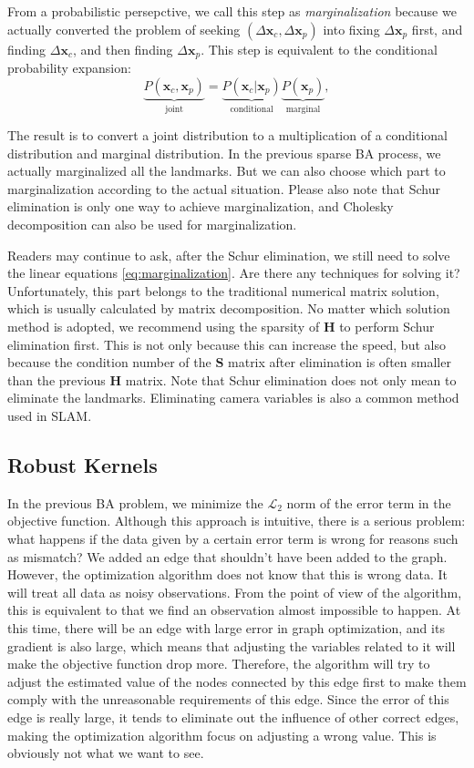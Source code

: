From a probabilistic persepctive, we call this step as \textit{marginalization} because we actually converted the problem of seeking $(\Delta \mathbf{x}_c, \Delta \mathbf{x}_p)$ into fixing  $\Delta \mathbf{x}_p$ first, and finding $\Delta \mathbf{x}_c$, and then finding $\Delta \mathbf{x}_p$. This step is equivalent to the conditional probability expansion:
\begin{equation}
	\underbrace{P( \mathbf{x}_c, \mathbf{x}_p )}_{\text{joint}} = \underbrace{P(\mathbf{x}_c | \mathbf{x}_p )}_{\text{conditional}} \underbrace{P( \mathbf{x}_p )}_{\text{marginal}} ,
\end{equation}

The result is to convert a joint distribution to a multiplication of a conditional distribution and marginal distribution. In the previous sparse BA process, we actually marginalized all the landmarks. But we can also choose which part to marginalization according to the actual situation. Please also note that Schur elimination is only one way to achieve marginalization, and Cholesky decomposition can also be used for marginalization.

Readers may continue to ask, after the Schur elimination, we still need to solve the linear equations \eqref{eq:marginalization}. Are there any techniques for solving it? Unfortunately, this part belongs to the traditional numerical matrix solution, which is usually calculated by matrix decomposition. No matter which solution method is adopted, we recommend using the sparsity of $\mathbf{H}$ to perform Schur elimination first. This is not only because this can increase the speed, but also because the condition number of the $\mathbf{S}$ matrix after elimination is often smaller than the previous $\mathbf{H}$ matrix. Note that Schur elimination does not only mean to eliminate the landmarks. Eliminating camera variables is also a common method used in SLAM.

\subsection{Robust Kernels}
In the previous BA problem, we minimize the $\mathcal{L}_2$ norm of the error term in the objective function. Although this approach is intuitive, there is a serious problem: what happens if the data given by a certain error term is wrong for reasons such as mismatch? We added an edge that shouldn't have been added to the graph. However, the optimization algorithm does not know that this is wrong data. It will treat all data as noisy observations. From the point of view of the algorithm, this is equivalent to that we find an observation almost impossible to happen. At this time, there will be an edge with large error in graph optimization, and its gradient is also large, which means that adjusting the variables related to it will make the objective function drop more. Therefore, the algorithm will try to adjust the estimated value of the nodes connected by this edge first to make them comply with the unreasonable requirements of this edge. Since the error of this edge is really large, it tends to eliminate out the influence of other correct edges, making the optimization algorithm focus on adjusting a wrong value. This is obviously not what we want to see.

